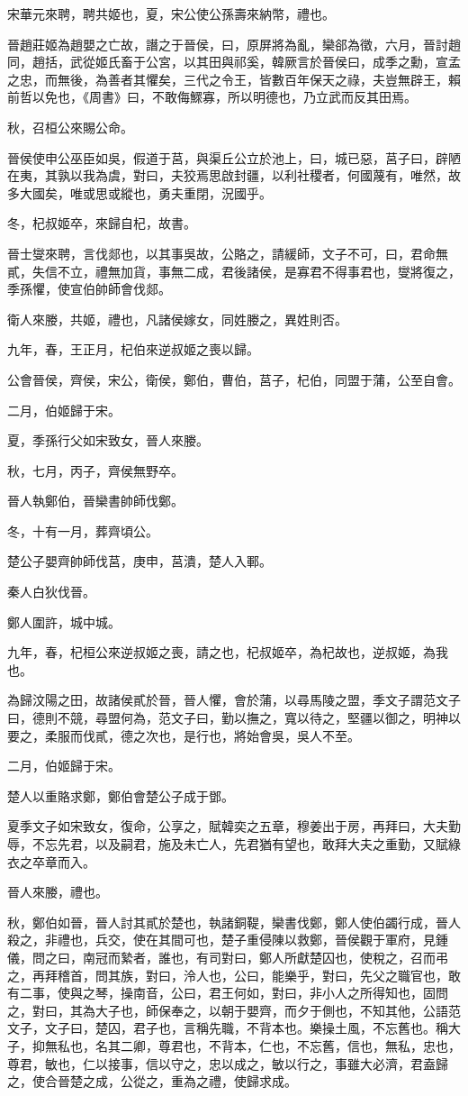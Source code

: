 \begin{pinyinscope}
宋華元來聘，聘共姬也，夏，宋公使公孫壽來納幣，禮也。

晉趙莊姬為趙嬰之亡故，譖之于晉侯，曰，原屏將為亂，欒郤為徵，六月，晉討趙同，趙括，武從姬氏畜于公宮，以其田與祁奚，韓厥言於晉侯曰，成季之勳，宣孟之忠，而無後，為善者其懼矣，三代之令王，皆數百年保天之祿，夫豈無辟王，賴前哲以免也，《周書》曰，不敢侮鰥寡，所以明德也，乃立武而反其田焉。

秋，召桓公來賜公命。

晉侯使申公巫臣如吳，假道于莒，與渠丘公立於池上，曰，城已惡，莒子曰，辟陋在夷，其孰以我為虞，對曰，夫狡焉思啟封疆，以利社稷者，何國蔑有，唯然，故多大國矣，唯或思或縱也，勇夫重閉，況國乎。

冬，杞叔姬卒，來歸自杞，故書。

晉士燮來聘，言伐郯也，以其事吳故，公賂之，請緩師，文子不可，曰，君命無貳，失信不立，禮無加貨，事無二成，君後諸侯，是寡君不得事君也，燮將復之，季孫懼，使宣伯帥師會伐郯。

衛人來媵，共姬，禮也，凡諸侯嫁女，同姓媵之，異姓則否。

九年，春，王正月，杞伯來逆叔姬之喪以歸。

公會晉侯，齊侯，宋公，衛侯，鄭伯，曹伯，莒子，杞伯，同盟于蒲，公至自會。

二月，伯姬歸于宋。

夏，季孫行父如宋致女，晉人來媵。

秋，七月，丙子，齊侯無野卒。

晉人執鄭伯，晉欒書帥師伐鄭。

冬，十有一月，葬齊頃公。

楚公子嬰齊帥師伐莒，庚申，莒潰，楚人入鄆。

秦人白狄伐晉。

鄭人圍許，城中城。

九年，春，杞桓公來逆叔姬之喪，請之也，杞叔姬卒，為杞故也，逆叔姬，為我也。

為歸汶陽之田，故諸侯貳於晉，晉人懼，會於蒲，以尋馬陵之盟，季文子謂范文子曰，德則不競，尋盟何為，范文子曰，勤以撫之，寬以待之，堅疆以御之，明神以要之，柔服而伐貳，德之次也，是行也，將始會吳，吳人不至。

二月，伯姬歸于宋。

楚人以重賂求鄭，鄭伯會楚公子成于鄧。

夏季文子如宋致女，復命，公享之，賦韓奕之五章，穆姜出于房，再拜曰，大夫勤辱，不忘先君，以及嗣君，施及未亡人，先君猶有望也，敢拜大夫之重勤，又賦綠衣之卒章而入。

晉人來媵，禮也。

秋，鄭伯如晉，晉人討其貳於楚也，執諸銅鞮，欒書伐鄭，鄭人使伯蠲行成，晉人殺之，非禮也，兵交，使在其間可也，楚子重侵陳以救鄭，晉侯觀于軍府，見鍾儀，問之曰，南冠而縶者，誰也，有司對曰，鄭人所獻楚囚也，使稅之，召而弔之，再拜稽首，問其族，對曰，泠人也，公曰，能樂乎，對曰，先父之職官也，敢有二事，使與之琴，操南音，公曰，君王何如，對曰，非小人之所得知也，固問之，對曰，其為大子也，師保奉之，以朝于嬰齊，而夕于側也，不知其他，公語范文子，文子曰，楚囚，君子也，言稱先職，不背本也。樂操土風，不忘舊也。稱大子，抑無私也，名其二卿，尊君也，不背本，仁也，不忘舊，信也，無私，忠也，尊君，敏也，仁以接事，信以守之，忠以成之，敏以行之，事雖大必濟，君盍歸之，使合晉楚之成，公從之，重為之禮，使歸求成。


\end{pinyinscope}
